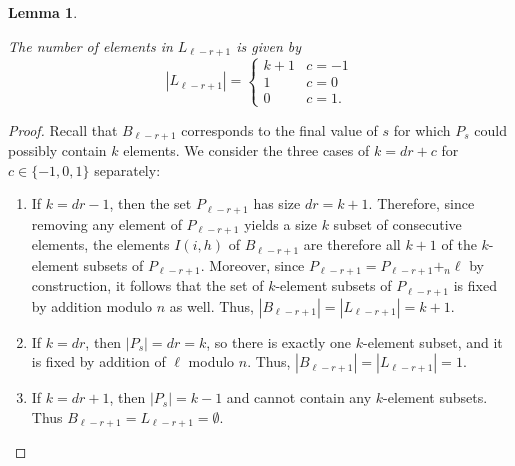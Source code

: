 \documentclass[11pt]{amsart}
\theoremstyle{plain}
\newtheorem{lemma}[theorem]{Lemma}
\theoremstyle{definition}
\begin{document}
\begin{lemma}
\label{Lemma:ModImps}

 The number of elements in $L_{\ell-r+1}$ is given by 
 \begin{equation*}
     |L_{\ell-r+1}|=\begin{cases}
         k+1 & c=-1\\
         1 & c=0\\
         0 & c=1.
     \end{cases}
 \end{equation*}
 \end{lemma}
\begin{proof}
Recall that $B_{\ell-r+1}$ corresponds to the final value of $s$ for which $P_s$ could possibly contain $k$ elements. We consider the three cases of $k=dr+c$ for $c\in \{-1, 0, 1\}$ separately:
\begin{enumerate}
    \item If $k=dr-1$, then the set $P_{\ell-r+1}$ has size $dr=k+1$. Therefore, since removing any element of $P_{\ell-r+1}$ yields a size $k$ subset of consecutive elements, the elements $I(i, h)$ of $B_{\ell-r+1}$ are therefore all $k+1$ of the $k$-element subsets of $P_{\ell-r+1}$. Moreover, since $P_{\ell-r+1}=P_{\ell-r+1}+_n \ell$ by construction, it follows that the set of $k$-element subsets of $P_{\ell-r+1}$ is fixed by addition modulo $n$ as well. Thus, $|B_{\ell-r+1}|=|L_{\ell-r+1}|=k+1$.
    \item If $k=dr$, then $|P _s|=dr=k$, so there is exactly one $k$-element subset, and it is fixed by addition of $\ell$ modulo $n$. Thus, $|B_{\ell-r+1}|=|L_{\ell-r+1}|=1$.
    \item If $k=dr+1$, then $|P_s|=k-1$ and cannot contain any $k$-element subsets. Thus $B_{\ell-r+1}=L_{\ell-r+1}=\emptyset$.
\end{enumerate}

    
\end{proof}
\end{document}
